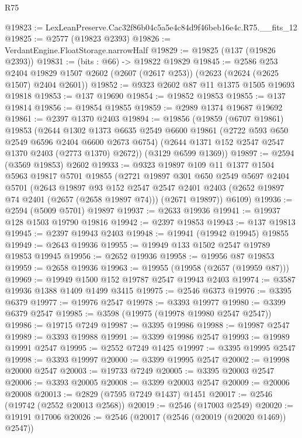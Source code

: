 \begin{lexlean}{R75}
\begin{coremodule}
@19823 := LexLeanPreserve.Cac32f86b04c5a5e4c84d9f46beb16e4c.R75.__fits_12
@19825 := @2577 (@19823 @2393)
@19826 := VerdantEngine.FloatStorage.narrowHalf
@19829 := @19825 (@137 (@19826 @2393))
@19831 := (bits : @66) -> @19822 @19829
@19845 := @2586
    @253
    @2404
    @19829
    @1507
    @2602
    (@2607 (@2617 @253))
    (@2623 (@2624 (@2625 @1507) @2404 @2601))
@19852 := @9323 @2602 @87 @11 @1375 @1505 @19693 @19818
@19853 := @137 @19690
@19854 := @19852 @19853
@19855 := @137 @19814
@19856 := @19854 @19855
@19859 := @2989 @1374 @19687 @19692
@19861 := @2397 @1370 @2403
@19894 := @19856
    (@19859
      (@6707 @19861)
      @19853
      (@2644
        @1302
        @1373
        @6635
        @2549
        @6600
        @19861
        (@2722 @593 @650 @2549 @6596 @2404 @6600 @2673 @6754)
        (@2644 @1371 @152 @2547 @2547 @1370 @2403 (@2773 @1370) @2672))
      (@3129 @6599 @1369))
@19897 := @2594 (@3569 @19853) @2602
@19933 := @9323
    @19897
    @109
    @11
    @1377
    @1504
    @5963
    @19817
    @5701
    @19855
    (@2721
      @19897
      @301
      @650
      @2549
      @5697
      @2404
      @5701
      (@2643
        @19897
        @93
        @152
        @2547
        @2547
        @2401
        @2403
        (@2652 @19897 @74 @2401 (@2657 (@2658 @19897 @74)))
        (@2671 @19897))
      @6109)
@19936 := @2594 (@5009 @5701) @19897
@19937 := @2633 @19936
@19941 := @19937 @128 @1503 @19790 @19816
@19942 := @2397 @19853
@19943 := @137 @19813
@19945 := @2397 @19943 @2403
@19948 := @19941 (@19942 @19945) @19855
@19949 := @2643 @19936
@19955 := @19949 @133 @1502 @2547 @19789 @19853 @19945
@19956 := @2652 @19936
@19958 := @19956 @87 @19853
@19959 := @2658 @19936
@19963 := @19955 (@19958 (@2657 (@19959 @87)))
@19969 := @19949 @1500 @152 @19787 @2547 @19943 @2403
@19974 := @3587 @19936 @1388 @1409 @1499 @3415
@19975 := @2546 @6373
@19976 := @3395 @6379
@19977 := @19976 @2547
@19978 := @3393 @19977
@19980 := @3399 @6379 @2547
@19985 := @3598 (@19975 (@19978 @19980 @2547 @2547))
@19986 := @19715 @7249
@19987 := @3395 @19986
@19988 := @19987 @2547
@19989 := @3393 @19988
@19991 := @3399 @19986 @2547
@19993 := @19989 @19991 @2547
@19995 := @2552 @7249 @1425
@19997 := @3395 @19995 @2547
@19998 := @3393 @19997
@20000 := @3399 @19995 @2547
@20002 := @19998 @20000 @2547
@20003 := @19733 @7249
@20005 := @3395 @20003 @2547
@20006 := @3393 @20005
@20008 := @3399 @20003 @2547
@20009 := @20006 @20008
@20013 := @2829 (@7595 @7249 @1437) @1451
@20017 := @2546 (@19742 (@2552 @20013 @2568))
@20019 := @2546 (@17003 @2549)
@20020 := @19191 @17006
@20026 := @2546 (@20017 (@2546 (@20019 (@20020 @1469)) @2547))

\end{coremodule}
\end{lexlean}
